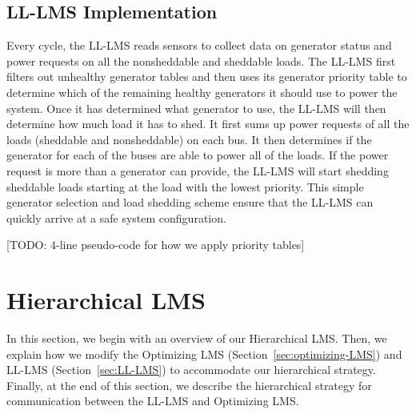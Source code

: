 \documentclass{acm_proc_article-sp}
\begin{document}
\subsection{LL-LMS Implementation}
Every cycle, the LL-LMS reads sensors to collect data on generator status and power requests on all the nonsheddable and sheddable loads. 
The LL-LMS first filters out unhealthy generator tables and then uses its generator priority table to determine which of the remaining healthy generators it should use to power the system. 
Once it has determined what generator to use, the LL-LMS will then determine how much load it has to shed. 
It first sums up power requests of all the loads (sheddable and nonsheddable) on each bus. 
It then determines if the generator for each of the buses are able to power all of the loads. 
If the power request is more than a generator can provide, the LL-LMS will start shedding sheddable loads starting at the load with the lowest priority. 
This simple generator selection and load shedding scheme ensure that the LL-LMS can quickly arrive at a safe system configuration.


[TODO: 4-line pseudo-code for how we apply priority tables]


\section{Hierarchical LMS}
In this section, we begin with an overview of our Hierarchical LMS.
Then, we explain how we modify the Optimizing LMS (Section~\ref{sec:optimizing-LMS}) and LL-LMS (Section~\ref{sec:LL-LMS}) to accommodate our hierarchical strategy.
Finally, at the end of this section, we describe the hierarchical strategy for communication between the LL-LMS and Optimizing LMS.
\end{document}
